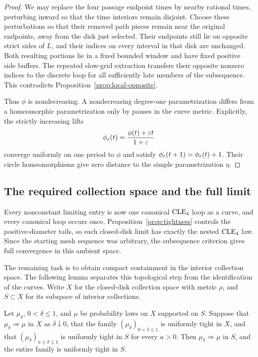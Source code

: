 \begin{proof}
We may replace the four passage endpoint times by nearby rational times, perturbing inward so that the time interiors remain disjoint. Choose these perturbations so that their removed path pieces remain near the original endpoints, away from the disk just selected. Their endpoints still lie on opposite strict sides of $L$, and their indices on every interval in that disk are unchanged. Both resulting portions lie in a fixed bounded window and have fixed positive side buffers. The repeated slow-grid extraction transfers their opposite nonzero indices to the discrete loop for all sufficiently late members of the subsequence. This contradicts Proposition~\ref{prop:local-opposite}.

Thus $\phi$ is nondecreasing. A nondecreasing degree-one parametrization differs from a homeomorphic parametrization only by pauses in the curve metric. Explicitly, the strictly increasing lifts
\[
 \phi_\varepsilon(t)=\frac{\phi(t)+\varepsilon t}{1+\varepsilon}
\]
converge uniformly on one period to $\phi$ and satisfy $\phi_\varepsilon(t+1)=\phi_\varepsilon(t)+1$. Their circle homeomorphisms give zero distance to the simple parametrization $\eta$.
\end{proof}

\subsection{The required collection space and the full limit}

Every nonconstant limiting entry is now one canonical $\mathrm{CLE}_4$ loop as a curve, and every canonical loop occurs once. Proposition~\ref{prop:tightness} controls the positive-diameter tails, so each closed-disk limit has exactly the nested $\mathrm{CLE}_4$ law. Since the starting mesh sequence was arbitrary, the subsequence criterion gives full convergence in this ambient space.

The remaining task is to obtain compact containment in the interior collection space. The following lemma separates this topological step from the identification of the curves. Write $X$ for the closed-disk collection space with metric $\rho$, and $S\subset X$ for its subspace of interior collections.

\begin{lemma}\label{lem:interior-restriction}
Let $\mu_\delta$, $0<\delta\le1$, and $\mu$ be probability laws on $X$ supported on $S$. Suppose that $\mu_\delta\Rightarrow\mu$ in $X$ as $\delta\downarrow0$, that the family $(\mu_\delta)_{0<\delta\le1}$ is uniformly tight in $X$, and that $(\mu_\delta)_{a\le\delta\le1}$ is uniformly tight in $S$ for every $a>0$. Then $\mu_\delta\Rightarrow\mu$ in $S$, and the entire family is uniformly tight in $S$.
\end{lemma}


